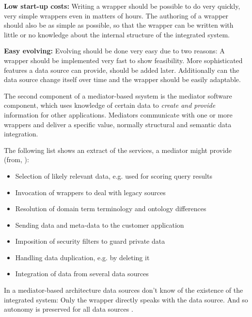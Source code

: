 \textbf{Low start-up costs:} Writing a wrapper should be possible to do very quickly, very simple wrappers even in matters of hours. The authoring of a wrapper should also be as simple as possible, so that the wrapper can be written with little or no knowledge about the internal structure of the integrated system.

\textbf{Easy evolving:} Evolving should be done very easy due to two reasons: A wrapper should be implemented very fast to show feasibility. More sophisticated features a data source can provide, should be added later. Additionally can the data source change  itself over time and the wrapper should be easily adaptable. 


The second component of a mediator-based ssystem is the mediator software component, which uses knowledge of certain data to \textit{create and provide} information for other applications. Mediators communicate with one or more wrappers and deliver a specific value, normally structural and semantic data integration.

The following list shows an extract of the services, a mediator might provide (from, \cite[p. 5-6]{Wiederhold1996TheCB}): 
\begin{itemize}
\item Selection of likely relevant data, e.g. used for scoring query results
\item Invocation of wrappers to deal with legacy sources
\item Resolution of domain term	terminology and ontology differences
\item Sending data and meta-data to the customer application
\item Imposition of security filters to guard private data
\item Handling data duplication, e.g. by deleting it
\item Integration of data from several data sources
\end{itemize}

In a mediator-based architecture data sources don't know of the existence of the integrated system: Only the wrapper directly speaks with the data source. And so autonomy is preserved for all data sources \cite[p. 97]{DBLP:books/dp/LeserN2006}.



